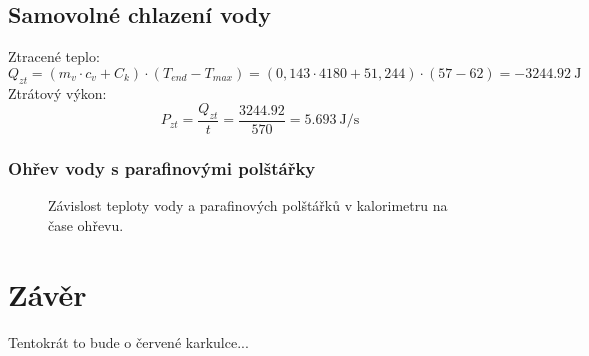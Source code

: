 \documentclass{protokol}
\begin{document}
\subsection{Samovolné chlazení vody }
Ztracené teplo: 
\[
	Q_{zt} = (m_{v} \cdot c_{v}+C_{k} ) \cdot (T_{end}-T_{max}) = (0,143 \cdot 4180 + 51,244) \cdot (57-62) = \qty{-3244.92}{\joule}
\]
Ztrátový výkon: 
\[
	P_{zt} =  \frac{Q_{zt}}{t}=\frac{3244.92}{570}=\qty{5,693}{\joule\per\second}
\]

\subsubsection{Ohřev vody s parafinovými polštářky}

\begin{figure*}[h!]
	\caption{Závislost teploty vody a parafinových polštářků v kalorimetru na čase ohřevu.}
\end{figure*}

\section{Závěr}
	Tentokrát to bude o červené karkulce...
\end{document}

